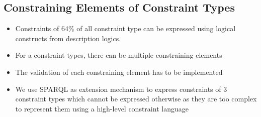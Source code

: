 \documentclass{llncs}
\begin{document}
\subsection{Constraining Elements of Constraint Types}

\begin{itemize}
  \item Constraints of 64\% of all constraint type can be expressed using logical constructs from description logics.	
	\item For a constraint types, there can be multiple constraining elements
	\item The validation of each constraining element has to be implemented
	\item We use SPARQL as extension mechanism to express constraints of 3 constraint types which cannot be expressed otherwise as they are too complex to represent them using a high-level constraint language
\end{itemize}
\end{document}
